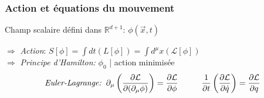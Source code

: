 \documentclass[handout]{beamer}
\begin{document}
\begin{frame}\frametitle{Action et équations du mouvement}

Champ scalaire défini dans $\mathbb{R}^{d+1}$: $\phi(\vec{x},t)$ \\
\begin{block}{}
$\Rightarrow$ \textit{Action}: $S[\phi] = \int{dt (L[\phi])}  =  \int{d^{\mu}x (\mathcal{L}[\phi])}$
\\[0.25 cm]$\Rightarrow$ \textit{Principe d'Hamilton:} $\phi_0$ | action minimisée 
\begin{align*} \textit{Euler-Lagrange:}\hspace{2 mm}
\partial_\mu \left(\frac{\partial\mathcal{L}}{\partial(\partial_\mu\phi)}\right) = \frac{\partial\mathcal{L}}{\partial\phi} \hspace{1 cm}  \frac{1}{\partial t} \left(\frac{\partial\mathcal{L}}{\partial\dot{q}}\right) = \frac{\partial\mathcal{L}}{\partial q} 
\end{align*} 

\end{block}



\end{frame}
\end{document}
